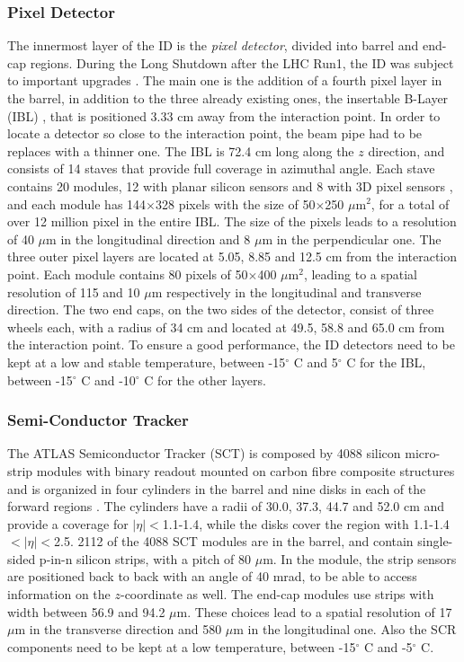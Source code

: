 \subsubsection*{Pixel Detector}
The innermost layer of the ID is the \textit{pixel detector}, divided into barrel and end-cap regions. During the Long Shutdown after the LHC Run1, the ID was subject to important upgrades \cite{Potamianos:2016ptf}. The main one is the addition of a fourth pixel layer in the barrel, in addition to the three already existing ones, the insertable B-Layer (IBL) \cite{Capeans:1291633}, that is positioned 3.33 cm away from the interaction point. In order to locate a detector so close to the interaction point, the beam pipe had to be replaces with a thinner one. The IBL is 72.4 cm long along the $z$ direction, and consists of 14 staves that provide full coverage in azimuthal angle. Each stave contains 20 modules, 12 with planar silicon sensors and 8 with 3D pixel sensors \cite{1748-0221-7-11-P11010}, and each module has 144$\times$328 pixels with the size of 50$\times$250 $\mu$m$^2$, for a total of over 12 million pixel in the entire IBL. The size of the pixels leads to a resolution of 40 $\mu$m in the longitudinal direction and 8 $\mu$m in the perpendicular one. The three outer pixel layers are located at 5.05, 8.85 and 12.5 cm from the interaction point. Each module contains 80 pixels of 50$\times$400 $\mu$m$^2$, leading to a spatial resolution of 115 and 10 $\mu$m respectively in the longitudinal and transverse direction. 
The two end caps, on the two sides of the detector, consist of three wheels each, with a radius of 34 cm and located at 49.5, 58.8 and 65.0 cm from the interaction point. 
To ensure a good performance, the ID detectors need to be kept at a low and stable temperature, between -15$^{\circ}$ C and 5$^{\circ}$ C for the IBL, between -15$^{\circ}$ C and -10$^{\circ}$ C for the other layers.

\subsubsection*{Semi-Conductor Tracker}
The ATLAS Semiconductor Tracker (SCT) is composed by 4088 silicon micro-strip modules with binary readout mounted on carbon fibre composite structures and is organized in four cylinders in the barrel and nine disks in each of the forward regions \cite{Jackson:sct}. The cylinders have a radii of 30.0, 37.3, 44.7 and 52.0 cm and provide a coverage for $|\eta|<$1.1-1.4, while the disks cover the region with 1.1-1.4$<|\eta|<$2.5. 
2112 of the 4088 SCT modules are in the barrel, and contain single-sided p-in-n silicon strips, with a pitch of 80 $\mu$m. In the module, the strip sensors are positioned back to back with an angle of 40 mrad, to be able to access information on the $z$-coordinate as well. The end-cap modules use strips with width between 56.9 and 94.2 $\mu$m. These choices lead to a spatial resolution of 17 $\mu$m in the transverse direction and 580 $\mu$m in the longitudinal one. Also the SCR components need to be kept at a low temperature, between -15$^{\circ}$ C and -5$^{\circ}$ C.

